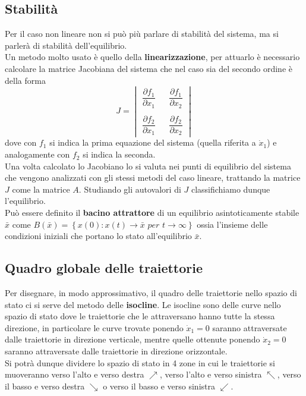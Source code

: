 \documentclass[a4paper]{article}
\begin{document}
	\subsection{Stabilità}
	Per il caso non lineare non si può più parlare di stabilità del sistema, ma si parlerà di stabilità dell'equilibrio. \\Un metodo molto usato è quello della \textbf{linearizzazione}, per attuarlo è necessario calcolare la matrice Jacobiana del sistema che nel caso sia del secondo ordine è della forma  
	\[
	J=
	\begin{vmatrix}
	\dfrac{\partial f_1}{\partial x_1} & &\dfrac{\partial f_1}{\partial x_2} \\
	& \\
	\dfrac{\partial f_2}{\partial x_1} & &\dfrac{\partial f_2}{\partial x_2} 					
	\end{vmatrix}
	\]
	dove con $f_1$ si indica la prima equazione del sistema (quella riferita a $\dot{x}_1$) e analogamente con $f_2$ si indica la seconda. \\
	Una volta calcolato lo Jacobiano lo si valuta nei punti di equilibrio del sistema che vengono analizzati con gli stessi metodi del caso lineare, trattando la matrice $J$ come la matrice $A$. Studiando gli autovalori di $J$ classifichiamo dunque l'equilibrio.\\ Può essere definito il \textbf{bacino attrattore} di un equilibrio asintoticamente stabile $\bar{x}$ come $B(\bar{x})=\left\lbrace x(0):x(t)\to \bar{x} \,\,per\,\, t\to\infty \right\rbrace $ ossia l'insieme delle condizioni iniziali che portano lo stato all'equilibrio $\bar{x}$.
		
	\subsection{Quadro globale delle traiettorie}
	Per disegnare, in modo approssimativo, il quadro delle traiettorie nello spazio di stato ci si serve del metodo delle \textbf{isocline}. Le isocline sono delle curve nello spazio di stato dove le traiettorie che le attraversano hanno tutte la stessa direzione, in particolare le curve trovate ponendo $\dot{x}_1=0$ saranno attraversate dalle traiettorie in direzione verticale, mentre quelle ottenute ponendo $\dot{x}_2=0$ saranno attraversate dalle traiettorie in direzione orizzontale. \\ Si potrà dunque dividere lo spazio di stato in 4 zone in cui le traiettorie si muoveranno verso l'alto e verso destra $\nearrow$, verso l'alto e verso sinistra $\nwarrow$, verso il basso e verso  destra $\searrow$ o verso il basso e verso sinistra $\swarrow$.
	
\end{document}
